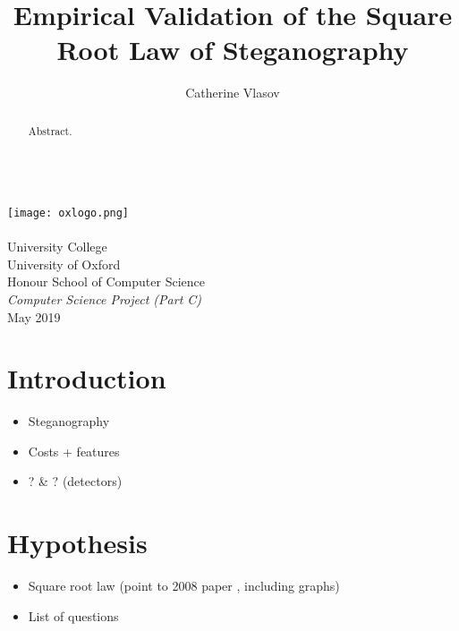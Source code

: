 \documentclass[11pt,a4paper,twoside,openright]{report}
\author{Catherine Vlasov}
\title{Empirical Validation of the Square Root Law of Steganography}
\begin{document}
\makeatletter
  \begin{titlepage}
    \vspace*{\fill}
      \begin{center}
        {\huge \bfseries \@title }
        \\[20ex]
        \texttt{[image: oxlogo.png]}
        \\[10ex]
        {\LARGE \@author}
        \\[3ex]
        {\Large University College}
        \\[1ex]
        {\Large University of Oxford}
        \\[8ex]
        {\Large Honour School of Computer Science}
        \\[1ex]
        {\Large \emph{Computer Science Project (Part C)}}
        \\[10ex]
        {\LARGE May 2019}
      \end{center}
    \vspace*{\fill}
  \end{titlepage}
\makeatother


\shipout\null


\begin{abstract}

Abstract.

\end{abstract}


\shipout\null
{}

\tableofcontents

\cleardoublepage
{}
\newpage

\chapter{Introduction}

\begin{itemize}
  \item Steganography
  \item Costs + features
  \item ? \& ? (detectors)
\end{itemize}

\chapter{Hypothesis}

\begin{itemize}
  \item Square root law (point to 2008 paper \cite{2008-paper}, including graphs)
  \item List of questions
\end{itemize}
\end{document}
